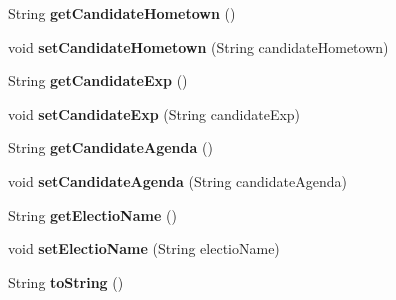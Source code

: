 \begin{DoxyCompactItemize}
\mbox{\label{class_models_1_1_candidate_a46ee32d17740626ac078e90eec2d4266}} 
String {\bfseries get\+Candidate\+Hometown} ()
\item 
\mbox{\label{class_models_1_1_candidate_adf5eaac43f62de826c9402ff92dc3c7a}} 
void {\bfseries set\+Candidate\+Hometown} (String candidate\+Hometown)
\item 
\mbox{\label{class_models_1_1_candidate_aaa5e56778db3b6c45764392b0e8fc2b2}} 
String {\bfseries get\+Candidate\+Exp} ()
\item 
\mbox{\label{class_models_1_1_candidate_a2c823d82e0c2ccbed69a8ba0aceb823b}} 
void {\bfseries set\+Candidate\+Exp} (String candidate\+Exp)
\item 
\mbox{\label{class_models_1_1_candidate_a0480cac66de8428802f6509268a4b99f}} 
String {\bfseries get\+Candidate\+Agenda} ()
\item 
\mbox{\label{class_models_1_1_candidate_a830ab7955950369a4ce1fac51371e20a}} 
void {\bfseries set\+Candidate\+Agenda} (String candidate\+Agenda)
\item 
\mbox{\label{class_models_1_1_candidate_a916349af109a138769c79ec42293bc3f}} 
String {\bfseries get\+Electio\+Name} ()
\item 
\mbox{\label{class_models_1_1_candidate_ae7eb94221d3426f6713d1d5788250f6c}} 
void {\bfseries set\+Electio\+Name} (String electio\+Name)
\item 
\mbox{\label{class_models_1_1_candidate_a61f7a47d6dbb69e01a58b39185af5e37}} 
String {\bfseries to\+String} ()
\end{DoxyCompactItemize}
